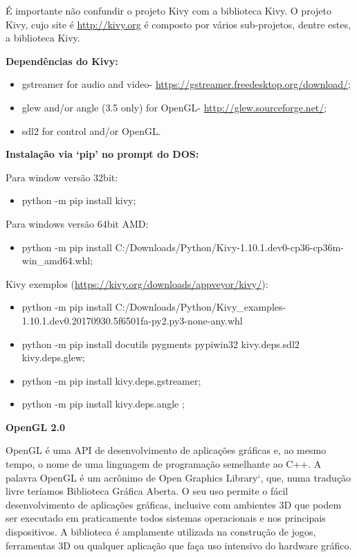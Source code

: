 \documentclass[12pt,]{article}
\providecommand{\tightlist}{%
  \setlength{\itemsep}{0pt}\setlength{\parskip}{0pt}}
\begin{document}
É importante não confundir o projeto Kivy com a biblioteca Kivy. O
projeto Kivy, cujo site é \url{http://kivy.org} é composto por vários
sub-projetos, dentre estes, a biblioteca Kivy.

\textbf{Dependências do Kivy:}

\begin{itemize}
\tightlist
\item
  gstreamer for audio and video-
  \url{https://gstreamer.freedesktop.org/download/};
\item
  glew and/or angle (3.5 only) for OpenGL-
  \url{http://glew.sourceforge.net/};
\item
  sdl2 for control and/or OpenGL.
\end{itemize}

\textbf{Instalação via `pip' no prompt do DOS:}

Para window versão 32bit:

\begin{itemize}
\tightlist
\item
  python -m pip install kivy;
\end{itemize}

Para windows versão 64bit AMD:

\begin{itemize}
\tightlist
\item
  python -m pip install
  C:/Downloads/Python/Kivy-1.10.1.dev0-cp36-cp36m-win\_amd64.whl;
\end{itemize}

Kivy exemplos (\url{https://kivy.org/downloads/appveyor/kivy/}):

\begin{itemize}
\item
  python -m pip install
  C:/Downloads/Python/Kivy\_examples-1.10.1.dev0.20170930.5f6501fa-py2.py3-none-any.whl
\item
  python -m pip install docutils pygments pypiwin32 kivy.deps.sdl2
  kivy.deps.glew;
\item
  python -m pip install kivy.deps.gstreamer;
\item
  python -m pip install kivy.deps.angle ;
\end{itemize}

\textbf{OpenGL 2.0}

OpenGL é uma API de desenvolvimento de aplicações gráficas e, ao mesmo
tempo, o nome de uma linguagem de programação semelhante ao C++. A
palavra OpenGL é um acrônimo de Open Graphics Library`, que, numa
tradução livre teríamos Biblioteca Gráfica Aberta. O seu uso permite o
fácil desenvolvimento de aplicações gráficas, inclusive com ambientes 3D
que podem ser executado em praticamente todos sistemas operacionais e
nos principais dispositivos. A biblioteca é amplamente utilizada na
construção de jogos, ferramentas 3D ou qualquer aplicação que faça uso
intensivo do hardware gráfico.
\end{document}
